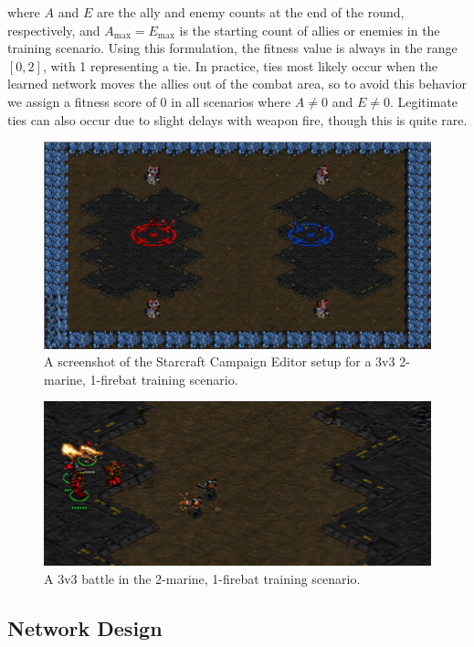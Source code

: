 \documentclass[10pt,a4paper,twocolumn]{article}
\begin{document}
where $A$ and $E$ are the ally and enemy counts at the end of the round, respectively, and $A_\mathrm{max} = E_\mathrm{max}$ is the starting count of allies or enemies in the training scenario. Using this formulation, the fitness value is always in the range $[0,2]$, with 1 representing a tie. In practice, ties most likely occur when the learned network moves the allies out of the combat area, so to avoid this behavior we assign a fitness score of 0 in all scenarios where $A \neq 0$ and $E \neq 0$. Legitimate ties can also occur due to slight delays with weapon fire, though this is quite rare.

\begin{figure}
\includegraphics[scale=.28]{figures/mf_setup.png}
\caption{A screenshot of the Starcraft Campaign Editor setup for a 3v3 2-marine, 1-firebat training scenario.}
\end{figure}


\begin{figure}
\includegraphics[scale=.34]{figures/mf_battle_small.png}
\caption{A 3v3 battle in the 2-marine, 1-firebat training scenario.}
\label{fig:training_setup}
\end{figure}

\subsection{Network Design}
\label{sec:net_design}
\end{document}
